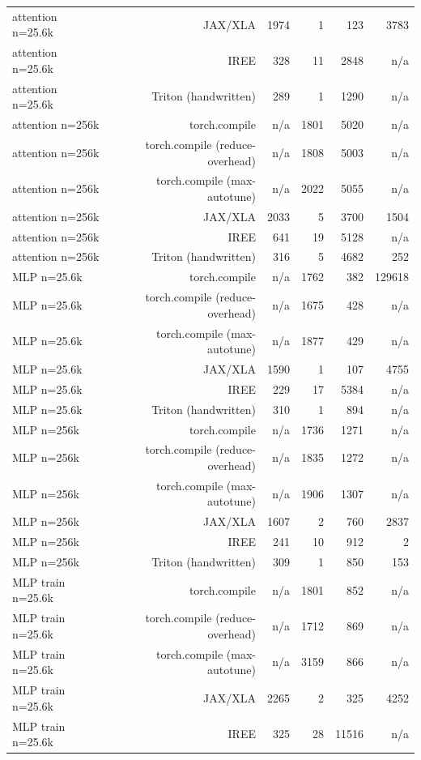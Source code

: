 \begin{tabular}{lrrrrr}
attention n=25.6k & JAX/XLA & 1974 & 1 & 123 & 3783 \\
attention n=25.6k & IREE & 328 & 11 & 2848 & n/a \\
attention n=25.6k & Triton (handwritten) & 289 & 1 & 1290 & n/a \\
attention n=256k & torch.compile & n/a & 1801 & 5020 & n/a \\
attention n=256k & torch.compile (reduce-overhead) & n/a & 1808 & 5003 & n/a \\
attention n=256k & torch.compile (max-autotune) & n/a & 2022 & 5055 & n/a \\
attention n=256k & JAX/XLA & 2033 & 5 & 3700 & 1504 \\
attention n=256k & IREE & 641 & 19 & 5128 & n/a \\
attention n=256k & Triton (handwritten) & 316 & 5 & 4682 & 252 \\
MLP n=25.6k & torch.compile & n/a & 1762 & 382 & 129618 \\
MLP n=25.6k & torch.compile (reduce-overhead) & n/a & 1675 & 428 & n/a \\
MLP n=25.6k & torch.compile (max-autotune) & n/a & 1877 & 429 & n/a \\
MLP n=25.6k & JAX/XLA & 1590 & 1 & 107 & 4755 \\
MLP n=25.6k & IREE & 229 & 17 & 5384 & n/a \\
MLP n=25.6k & Triton (handwritten) & 310 & 1 & 894 & n/a \\
MLP n=256k & torch.compile & n/a & 1736 & 1271 & n/a \\
MLP n=256k & torch.compile (reduce-overhead) & n/a & 1835 & 1272 & n/a \\
MLP n=256k & torch.compile (max-autotune) & n/a & 1906 & 1307 & n/a \\
MLP n=256k & JAX/XLA & 1607 & 2 & 760 & 2837 \\
MLP n=256k & IREE & 241 & 10 & 912 & 2 \\
MLP n=256k & Triton (handwritten) & 309 & 1 & 850 & 153 \\
MLP train n=25.6k & torch.compile & n/a & 1801 & 852 & n/a \\
MLP train n=25.6k & torch.compile (reduce-overhead) & n/a & 1712 & 869 & n/a \\
MLP train n=25.6k & torch.compile (max-autotune) & n/a & 3159 & 866 & n/a \\
MLP train n=25.6k & JAX/XLA & 2265 & 2 & 325 & 4252 \\
MLP train n=25.6k & IREE & 325 & 28 & 11516 & n/a \\

\end{tabular}
